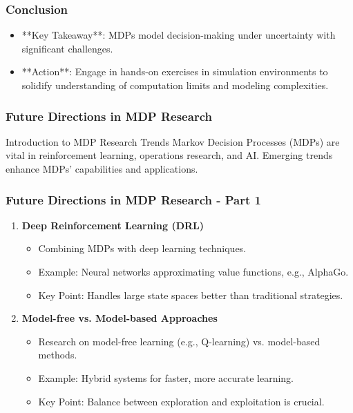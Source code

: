 \documentclass[aspectratio=169]{beamer}
\begin{document}
\begin{frame}[fragile]
    \frametitle{Conclusion}
    \begin{itemize}
        \item **Key Takeaway**: MDPs model decision-making under uncertainty with significant challenges.
        \item **Action**: Engage in hands-on exercises in simulation environments to solidify understanding of computation limits and modeling complexities.
    \end{itemize}
\end{frame}

\begin{frame}[fragile]
    \frametitle{Future Directions in MDP Research}
    \begin{block}{Introduction to MDP Research Trends}
        Markov Decision Processes (MDPs) are vital in reinforcement learning, operations research, and AI. Emerging trends enhance MDPs' capabilities and applications.
    \end{block}
\end{frame}

\begin{frame}[fragile]
    \frametitle{Future Directions in MDP Research - Part 1}
    \begin{enumerate}
        \item \textbf{Deep Reinforcement Learning (DRL)}
            \begin{itemize}
                \item Combining MDPs with deep learning techniques.
                \item Example: Neural networks approximating value functions, e.g., AlphaGo.
                \item Key Point: Handles large state spaces better than traditional strategies.
            \end{itemize}

        \item \textbf{Model-free vs. Model-based Approaches}
            \begin{itemize}
                \item Research on model-free learning (e.g., Q-learning) vs. model-based methods.
                \item Example: Hybrid systems for faster, more accurate learning.
                \item Key Point: Balance between exploration and exploitation is crucial.
            \end{itemize}
    \end{enumerate}
\end{frame}
\end{document}
